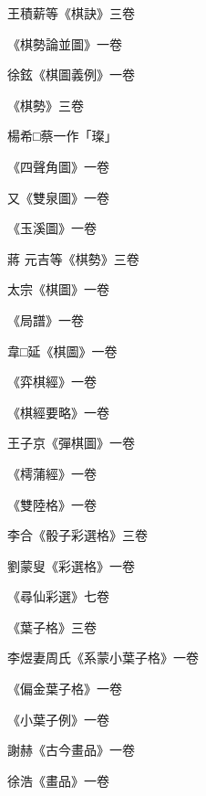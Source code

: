\begin{pinyinscope}
 王積薪等《棋訣》三卷



 《棋勢論並圖》一卷



 徐鉉《棋圖義例》一卷



 《棋勢》三卷



 楊希□蔡一作「璨」



 《四聲角圖》一卷



 又《雙泉圖》一卷



 《玉溪圖》一卷



 蔣
 元吉等《棋勢》三卷



 太宗《棋圖》一卷



 《局譜》一卷



 韋□延《棋圖》一卷



 《弈棋經》一卷



 《棋經要略》一卷



 王子京《彈棋圖》一卷



 《樗蒲經》一卷



 《雙陸格》一卷



 李合《骰子彩選格》三卷



 劉蒙叟《彩選格》一卷



 《尋仙彩選》七卷



 《葉子格》三卷



 李煜妻周氏《系蒙小葉子格》一卷



 《偏金葉子格》一卷



 《小葉子例》一卷



 謝赫《古今畫品》一卷



 徐浩《畫品》一卷




\end{pinyinscope}
